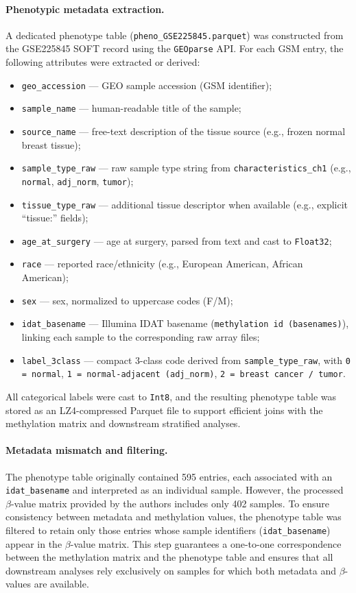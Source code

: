 \documentclass[10pt]{extarticle}
\begin{document}
\paragraph{Phenotypic metadata extraction.}
A dedicated phenotype table (\texttt{pheno\_GSE225845.parquet}) was constructed from the GSE225845 SOFT record using the \texttt{GEOparse} API.  
For each GSM entry, the following attributes were extracted or derived:
\begin{itemize}[label=-]
  \item \texttt{geo\_accession} — GEO sample accession (GSM identifier);
  \item \texttt{sample\_name} — human-readable title of the sample;
  \item \texttt{source\_name} — free-text description of the tissue source (e.g., frozen normal breast tissue);
  \item \texttt{sample\_type\_raw} — raw sample type string from \texttt{characteristics\_ch1} (e.g., \texttt{normal}, \texttt{adj\_norm}, \texttt{tumor});
  \item \texttt{tissue\_type\_raw} — additional tissue descriptor when available (e.g., explicit “tissue:” fields);
  \item \texttt{age\_at\_surgery} — age at surgery, parsed from text and cast to \texttt{Float32};
  \item \texttt{race} — reported race/ethnicity (e.g., European American, African American);
  \item \texttt{sex} — sex, normalized to uppercase codes (F/M);
  \item \texttt{idat\_basename} — Illumina IDAT basename (\texttt{methylation id (basenames)}), linking each sample to the corresponding raw array files;
  \item \texttt{label\_3class} — compact 3-class code derived from \texttt{sample\_type\_raw}, with  
    \texttt{0 = normal}, \texttt{1 = normal-adjacent (adj\_norm)}, \texttt{2 = breast cancer / tumor}.
\end{itemize}
All categorical labels were cast to \texttt{Int8}, and the resulting phenotype table was stored as an LZ4-compressed Parquet file to support efficient joins with the methylation matrix and downstream stratified analyses.

\paragraph{Metadata mismatch and filtering.}
The phenotype table originally contained 595 entries, each associated with an \texttt{idat\_basename} and interpreted as an individual sample.  
However, the processed $\beta$-value matrix provided by the authors includes only 402 samples.  
To ensure consistency between metadata and methylation values, the phenotype table was filtered to retain only those entries whose sample identifiers (\texttt{idat\_basename}) appear in the $\beta$-value matrix.  
This step guarantees a one-to-one correspondence between the methylation matrix and the phenotype table and ensures that all downstream analyses rely exclusively on samples for which both metadata and $\beta$-values are available.
\end{document}
